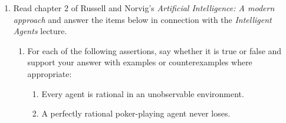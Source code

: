 \documentclass[11pt]{article}
\newcommand{\question}[1]{#1}
\newcommand{\answer}[1]{}
\begin{document}
\begin{enumerate}
\begin{enumerate}
\end{enumerate}


\item Read chapter 2 of Russell and Norvig's \emph{Artificial Intelligence: A modern approach} and answer the items below in connection with the \emph{Intelligent Agents} lecture.

\begin{enumerate}

 \item
  \question{For each of the following assertions, say whether it is true or false and support your
answer with examples or counterexamples where appropriate:
\begin{enumerate}
\item  Every agent is rational in an unobservable environment.
\item  A perfectly rational poker-playing agent never loses.
\end{enumerate}}
  \answer{
  \begin{enumerate}

\end{enumerate}}
\end{enumerate}
\end{enumerate}
\end{document}
